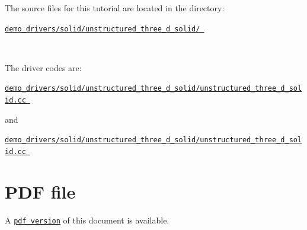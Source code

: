 \begin{DoxyItemize}
\item The source files for this tutorial are located in the directory\+:~\newline
~\newline
\begin{center} \href{../../../../demo_drivers/solid/unstructured_three_d_solid/}{\tt demo\+\_\+drivers/solid/unstructured\+\_\+three\+\_\+d\+\_\+solid/ } \end{center} ~\newline

\item The driver codes are\+: ~\newline
~\newline
\begin{center} \href{../../../../demo_drivers/solid/unstructured_three_d_solid/unstructured_three_d_solid.cc}{\tt demo\+\_\+drivers/solid/unstructured\+\_\+three\+\_\+d\+\_\+solid/unstructured\+\_\+three\+\_\+d\+\_\+solid.\+cc } \end{center}  and \begin{center} \href{../../../../demo_drivers/solid/unstructured_three_d_solid/unstructured_three_d_solid.cc}{\tt demo\+\_\+drivers/solid/unstructured\+\_\+three\+\_\+d\+\_\+solid/unstructured\+\_\+three\+\_\+d\+\_\+solid.\+cc } \end{center} 
\end{DoxyItemize}



 

 \hypertarget{index_pdf}{}\section{P\+D\+F file}\label{index_pdf}
A \href{../latex/refman.pdf}{\tt pdf version} of this document is available. 
